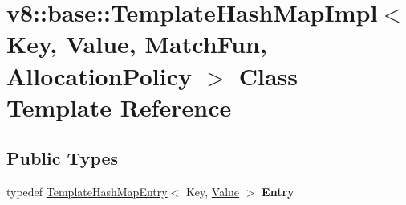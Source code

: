 \hypertarget{classv8_1_1base_1_1TemplateHashMapImpl}{}\section{v8\+:\+:base\+:\+:Template\+Hash\+Map\+Impl$<$ Key, Value, Match\+Fun, Allocation\+Policy $>$ Class Template Reference}
\label{classv8_1_1base_1_1TemplateHashMapImpl}
\subsection*{Public Types}
\begin{DoxyCompactItemize}
\item 
\mbox{\label{classv8_1_1base_1_1TemplateHashMapImpl_a918d7d0f02ebe6f556a037c5a688a34f}} 
typedef \mbox{\hyperlink{structv8_1_1base_1_1TemplateHashMapEntry}{Template\+Hash\+Map\+Entry}}$<$ Key, \mbox{\hyperlink{classv8_1_1Value}{Value}} $>$ {\bfseries Entry}
\end{DoxyCompactItemize}
